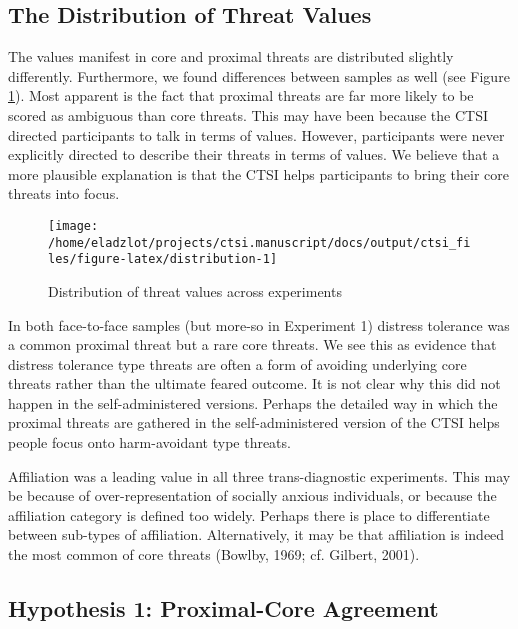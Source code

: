 \documentclass[
  man,floatsintext]{apa7}
\begin{document}
\subsection{The Distribution of Threat Values}\label{the-distribution-of-threat-values}

The values manifest in core and proximal threats are distributed slightly differently.
Furthermore, we found differences between samples as well (see Figure \ref{fig:distribution}).
Most apparent is the fact that proximal threats are far more likely to be scored as ambiguous than core threats.
This may have been because the CTSI directed participants to talk in terms of values.
However, participants were never explicitly directed to describe their threats in terms of values.
We believe that a more plausible explanation is that the CTSI helps participants to bring their core threats into focus.



\begin{figure}
\texttt{[image: /home/eladzlot/projects/ctsi.manuscript/docs/output/ctsi\_files/figure-latex/distribution-1]} \caption{Distribution of threat values across experiments}\label{fig:distribution}
\end{figure}

In both face-to-face samples (but more-so in Experiment 1) distress tolerance was a common proximal threat but a rare core threats.
We see this as evidence that distress tolerance type threats are often a form of avoiding underlying core threats rather than the ultimate feared outcome.
It is not clear why this did not happen in the self-administered versions.
Perhaps the detailed way in which the proximal threats are gathered in the self-administered version of the CTSI helps people focus onto harm-avoidant type threats.

Affiliation was a leading value in all three trans-diagnostic experiments.
This may be because of over-representation of socially anxious individuals, or because the affiliation category is defined too widely.
Perhaps there is place to differentiate between sub-types of affiliation.
Alternatively, it may be that affiliation is indeed the most common of core threats (Bowlby, 1969; cf. Gilbert, 2001).

\subsection{Hypothesis 1: Proximal-Core Agreement}\label{hypothesis-1-proximal-core-agreement}
\end{document}
